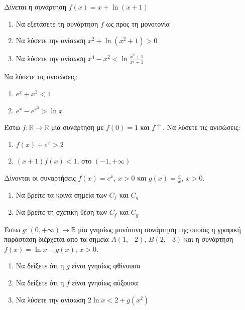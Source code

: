 \documentclass{presentation}
\begin{document}
\begin{askisi}
      Δίνεται η συνάρτηση $f(x)=x+\ln (x+1)$
      \begin{enumerate}
            \item Να εξετάσετε τη συνάρτηση $f$ ως προς τη μονοτονία \pause
            \item Να λύσετε την ανίσωση $x^2+\ln (x^2+1)>0$ \pause
            \item Να λύσετε την ανίσωση $x^4-x^2<\ln \frac{x^2+1}{x^4+1}$
      \end{enumerate}
\end{askisi}

\begin{askisi}
      Να λύσετε τις ανισώσεις:
      \begin{enumerate}
            \item $e^x+x^3<1$ \pause
            \item $e^x-e^{x^2}>\ln x$
      \end{enumerate}
\end{askisi}

\begin{askisi}
      Έστω $f:\mathbb{R}\to\mathbb{R}$ μία συνάρτηση με $f(0)=1$ και $f\uparrow$. Να λύσετε τις ανισώσεις:
      \begin{enumerate}
            \item $f(x)+e^x>2$ \pause
            \item $(x+1)f(x)<1$, στο $(-1,+\infty)$
      \end{enumerate}
\end{askisi}

\begin{askisi}
      Δίνονται οι συναρτήσεις $f(x)=e^x$, $x>0$ και $g(x)=\frac{e}{x}$, $x>0$.
      \begin{enumerate}
            \item Να βρείτε τα κοινά σημεία των $C_f$ και $C_g$ \pause
            \item Να βρείτε τη σχετική θέση των $C_f$ και $C_g$
      \end{enumerate}
\end{askisi}

\begin{askisi}
      Έστω $g:(0,+\infty)\to\mathbb{R}$ μία γνησίως μονότονη συνάρτηση της οποίας η γραφική παράσταση διέρχεται από τα σημεία $Α(1,-2)$, $Β(2,-3)$ και η συνάρτηση $f(x)=\ln x-g(x)$, $x>0$.
      \begin{enumerate}
            \item Να δείξετε ότι η $g$ είναι γνησίως φθίνουσα \pause
            \item Να δείξετε ότι η $f$ είναι γνησίως αύξουσα \pause
            \item Να λύσετε την ανίσωση $2\ln x<2+g(x^2)$
      \end{enumerate}
\end{askisi}
\end{document}
